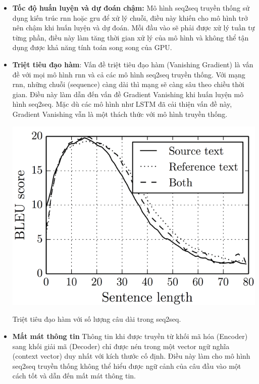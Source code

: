 \documentclass[a4paper, 12pt, openany]{book}
\begin{document}
\begin{itemize}
    \item \textbf{Tốc độ huấn luyện và dự đoán chậm:} Mô hình \ac{seq2seq} truyền thống sử dụng kiến trúc \ac{rnn} hoặc \ac{gru} để xử lý chuỗi, điều này khiến cho mô hình trở nên chậm khi huấn luyện và dự đoán.
    Mỗi đầu vào sẽ phải được xử lý tuần tự từng phần, điều này làm tăng thời gian xử lý của mô hình và không thể tận dụng được khả năng tính toán song song của GPU.
    
    \item \textbf{Triệt tiêu đạo hàm}: Vấn đề triệt tiêu đạo hàm (Vanishing Gradient) là vấn đề với mọi mô hình \ac{rnn} và cả
    các mô hình \ac{seq2seq} truyền thống. Với mạng \ac{rnn}, những chuỗi (sequence) càng dài thì mạng sẽ càng sâu
    theo chiều thời gian. Điều này làm dẫn đến vấn đề Gradient Vanishing khi huấn luyện mô hình \ac{seq2seq}.
    Mặc dù các mô hình như LSTM đã cải thiện vấn đề này, Gradient Vanishing vẫn là một thách thức với mô hình truyền thống.

    \begin{minipage}{\linewidth}
        \captionsetup{type=figure}
        \centering
        \includegraphics[width=.8\linewidth]{./assets/images/seq2seq_limit.png}
        \caption{Triệt tiêu đạo hàm với số lượng câu dài trong \ac{seq2seq}.}
    \end{minipage}
    \vspace{0.5cm}

    \item \textbf{Mất mát thông tin} Thông tin khi được truyền từ khối mã hóa (Encoder) sang khối giải mã (Decoder)
    chỉ được nén trong một vector ngữ nghĩa (context vector) duy nhất với kích thước cố định.
    Điều này làm cho mô hình \ac{seq2seq} truyền thống không thể hiểu được ngữ cảnh của câu đầu vào một cách tốt và dẫn đến mất mát thông tin.


\end{itemize}
\end{document}
